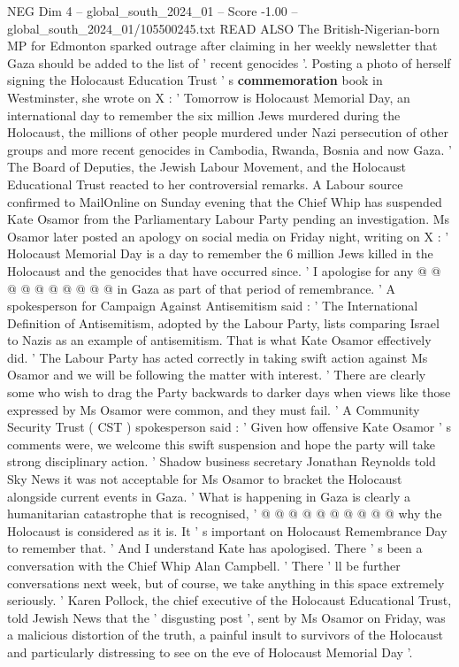 \begin{textsample}{NEG Dim 4 – global\_south\_2024\_01 – Score -1.00 – global\_south\_2024\_01/105500245.txt}  \label{ex:f4_neg_081}
READ ALSO The British-Nigerian-born MP for Edmonton sparked outrage after claiming in her weekly newsletter that Gaza should be added to the list of ' recent genocides '.
Posting a photo of herself signing the Holocaust Education Trust ' s \textbf{commemoration} book in Westminster, she wrote on X : ' Tomorrow is Holocaust Memorial Day, an international day to remember the six million Jews murdered during the Holocaust, the millions of other people murdered under Nazi persecution of other groups and more recent genocides in Cambodia, Rwanda, Bosnia and now Gaza. ' The Board of Deputies, the Jewish Labour Movement, and the Holocaust Educational Trust reacted to her controversial remarks.
A Labour source confirmed to MailOnline on Sunday evening that the Chief Whip has suspended Kate Osamor from the Parliamentary Labour Party pending an investigation.
Ms Osamor later posted an apology on social media on Friday night, writing on X : ' Holocaust Memorial Day is a day to remember the 6 million Jews killed in the Holocaust and the genocides that have occurred since. ' I apologise for any @ @ @ @ @ @ @ @ @ @ in Gaza as part of that period of remembrance. ' A spokesperson for Campaign Against Antisemitism said : ' The International Definition of Antisemitism, adopted by the Labour Party, lists comparing Israel to Nazis as an example of antisemitism.
That is what Kate Osamor effectively did. ' The Labour Party has acted correctly in taking swift action against Ms Osamor and we will be following the matter with interest. ' There are clearly some who wish to drag the Party backwards to darker days when views like those expressed by Ms Osamor were common, and they must fail. ' A Community Security Trust ( CST ) spokesperson said : ' Given how offensive Kate Osamor ' s comments were, we welcome this swift suspension and hope the party will take strong disciplinary action. ' Shadow business secretary Jonathan Reynolds told Sky News it was not acceptable for Ms Osamor to bracket the Holocaust alongside current events in Gaza. ' What is happening in Gaza is clearly a humanitarian catastrophe that is recognised, ' @ @ @ @ @ @ @ @ @ @ why the Holocaust is considered as it is.
It ' s important on Holocaust Remembrance Day to remember that. ' And I understand Kate has apologised.
There ' s been a conversation with the Chief Whip Alan Campbell. ' There ' ll be further conversations next week, but of course, we take anything in this space extremely seriously. ' Karen Pollock, the chief executive of the Holocaust Educational Trust, told Jewish News that the ' disgusting post ', sent by Ms Osamor on Friday, was a malicious distortion of the truth, a painful insult to survivors of the Holocaust and particularly distressing to see on the eve of Holocaust Memorial Day '.

\end{textsample}
